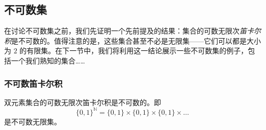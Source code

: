 
\subsection{不可数集}

在讨论不可数集之前，我们先证明一个先前提及的结果：集合的可数无限次\emph{笛卡尔积}是不可数的。值得注意的是，这些集合甚至不必是无限集——它们可以都是大小为 $2$ 的有限集。在下一节中，我们将利用这一结论展示一些不可数集的例子，包括一个我们熟知的集合……

\subsubsection*{不可数笛卡尔积}

\begin{theorem}
    双元素集合的可数无限次笛卡尔积是不可数的。即
    \[\{0, 1\}^{\mathbb{N}} = \{0, 1\} \times \{0, 1\} \times \{0, 1\} \times \dots\]
    是不可数无限集。
\end{theorem}

